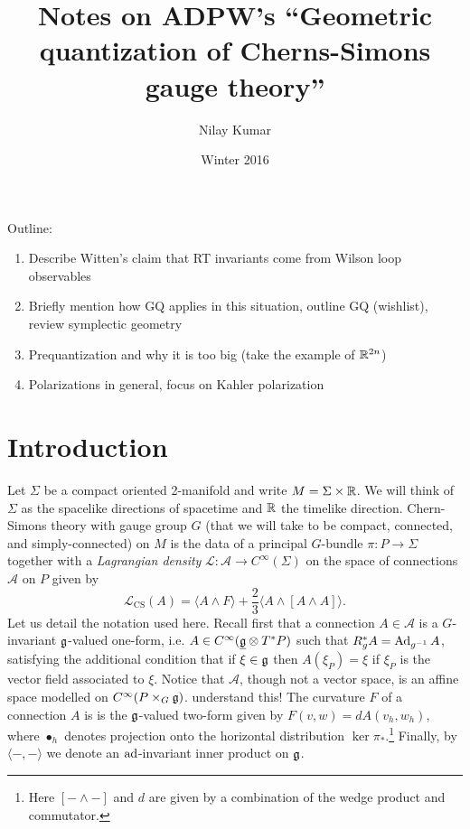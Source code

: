 \documentclass{amsart}
\title{Notes on ADPW's ``Geometric quantization of Cherns-Simons gauge theory''}
\author{Nilay Kumar}
\date{Winter 2016}
\begin{document}
\maketitle
\tableofcontents

Outline:
\begin{enumerate}
    \item Describe Witten's claim that RT invariants come from Wilson loop observables
    \item Briefly mention how GQ applies in this situation, outline GQ (wishlist), review symplectic geometry
    \item Prequantization and why it is too big (take the example of $\mathbb{R}^{2n}$)
    \item Polarizations in general, focus on Kahler polarization
\end{enumerate}

\section{Introduction}
Let $\Sigma$ be a compact oriented 2-manifold and write $M=\Sigma\times\mathbb{R}$. We will think of $\Sigma$ as the
spacelike directions of spacetime and $\mathbb{R}$ the timelike direction. Chern-Simons theory with gauge
group $G$ (that we will take to be compact, connected, and simply-connected) on $M$ is the data of a principal
$G$-bundle $\pi:P\to\Sigma$ together with a
\textit{Lagrangian density} $\mathscr{L}:\mathscr{A}\to C^\infty(\Sigma)$ on the space of connections $\mathscr{A}$ on $P$
given by
\begin{equation*}
    \mathscr{L}_\text{CS}(A) = \langle A\wedge F\rangle + \frac{2}{3}\langle A\wedge [A\wedge A]\rangle.
\end{equation*}
Let us detail the notation used here. Recall first that a connection $A\in\mathscr{A}$ is
a $G$-invariant $\mathfrak g$-valued one-form, i.e. $A\in C^\infty(\underline{\mathfrak g}\otimes T^*P)$ such that
$R_g^*A = \operatorname{Ad}_{g^{-1}}A$, satisfying the additional condition that if $\xi\in\mathfrak g$ then
$A(\xi_P)=\xi$ if $\xi_P$ is the vector field associated to $\xi$. Notice that $\mathscr{A}$,
though not a vector space, is an affine space modelled on $C^\infty(P\times_G\mathfrak g)$. {\color{red}understand this!}
The curvature $F$ of a connection $A$ is is the $\mathfrak g$-valued two-form given by $F(v,w) = dA(v_h,w_h)$,
where $\bullet_h$ denotes projection onto the horizontal distribution $\ker\pi_*$.\footnote{Here
$[-\wedge-]$ and $d$ are given by a combination of the wedge product and commutator.}
Finally, by $\langle-,-\rangle$ we denote an $\operatorname{ad}$-invariant inner product on $\mathfrak g$.
\end{document}
